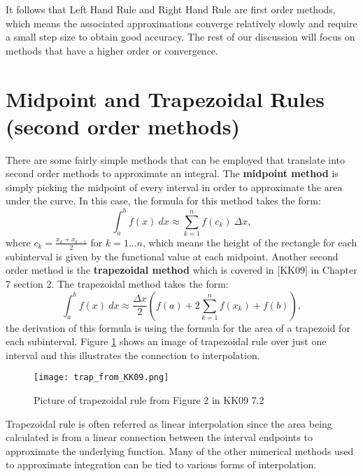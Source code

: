 \documentclass[twoside]{article}
\renewcommand{\cite}[1]{[#1]}
\def\ds{\displaystyle}
\begin{document}
It follows that Left Hand Rule and Right Hand Rule are first order methods, which means the associated approximations converge relatively slowly and require a small step size to obtain good accuracy. The rest of our discussion will focus on methods that have a higher order or convergence. 

\section{Midpoint and Trapezoidal Rules (second order methods)}
There are some fairly simple methods that can be employed that translate into second order methods to approximate an integral. The {\bf midpoint method} is simply picking the midpoint of every interval in order to approximate the area under the curve. In this case, the formula for this method takes the form:
$$\int_a^b f(x) \ dx \approx \sum_{k=1}^n f(c_{k}) \ \Delta x,$$
where $\ds c_k = \frac {x_k+x_{k-1}}2$ for $k=1...n$, which means the height of the rectangle for each subinterval is given by the functional value at each midpoint. Another second order method is the {\bf trapezoidal method} which is covered in \cite{KK09} in Chapter 7 section 2. The trapezoidal method takes the form:
$$\int_a^b f(x) \ dx \approx \frac {\Delta x}2 \left (f(a) + 2\sum_{k=1}^n f(x_k) + f(b) \right),$$
the derivation of this formula is using the formula for the area of a trapezoid for each subinterval. Figure \ref{f:TrapRule} shows an image of trapezoidal rule over just one interval and this illustrates the connection to interpolation. 
\begin{figure}[ht]
\centering
\texttt{[image: trap\_from\_KK09.png]}
 \caption{Picture of trapezoidal rule from Figure 2 in KK09 7.2}
 \label{f:TrapRule}
\end{figure}
Trapezoidal rule is often referred as linear interpolation since the area being calculated is from a linear connection between the interval endpoints to approximate the underlying function. Many of the other numerical methods used to approximate integration can be tied to various forms of interpolation. 
\end{document}
